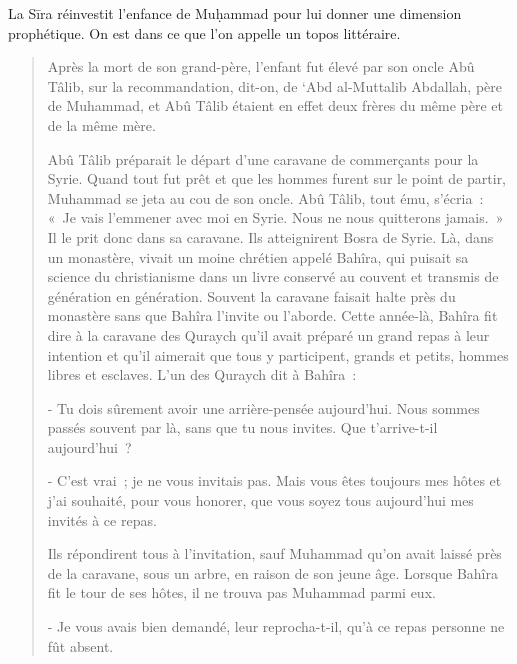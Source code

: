 La Sīra réinvestit l'enfance de Muḥammad pour lui donner une dimension
prophétique. On est dans ce que l'on appelle un topos  littéraire.

\begin{quotation}
    

Après la mort de son grand-père, l'enfant fut élevé par son oncle Abû
Tâlib, sur la recommandation, dit-on, de `Abd al-Muttalib Abdallah, père
de Muhammad, et Abû Tâlib étaient en effet deux frères du même père et
de la même mère.

Abû Tâlib préparait le départ d'une caravane de commerçants pour la
Syrie. Quand tout fut prêt et que les hommes furent sur le point de
partir, Muhammad se jeta au cou de son oncle. Abû Tâlib, tout ému,
s'écria~: «~Je vais l'emmener avec moi en Syrie. Nous ne nous quitterons
jamais.~» Il le prit donc dans sa caravane. Ils atteignirent Bosra de
Syrie. Là, dans un monastère, vivait un moine chrétien appelé Bahîra,
qui puisait sa science du christianisme dans un livre conservé au
couvent et transmis de génération en génération. Souvent la caravane
faisait halte près du monastère sans que Bahîra l'invite ou l'aborde.
Cette année-là, Bahîra fit dire à la caravane des Quraych qu'il avait
préparé un grand repas à leur intention et qu'il aimerait que tous y
participent, grands et petits, hommes libres et esclaves. L'un des
Quraych dit à Bahîra~:

- Tu dois sûrement avoir une arrière-pensée aujourd'hui. Nous sommes
passés souvent par là, sans que tu nous invites. Que t'arrive-t-il
aujourd'hui~?

- C'est vrai~; je ne vous invitais pas. Mais vous êtes toujours mes
hôtes et j'ai souhaité, pour vous honorer, que vous soyez tous
aujourd'hui mes invités à ce repas.

Ils répondirent tous à l'invitation, sauf Muhammad qu'on avait laissé
près de la caravane, sous un arbre, en raison de son jeune âge. Lorsque
Bahîra fit le tour de ses hôtes, il ne trouva pas Muhammad parmi eux.

- Je vous avais bien demandé, leur reprocha-t-il, qu'à ce repas personne
ne fût absent.


\end{quotation}
